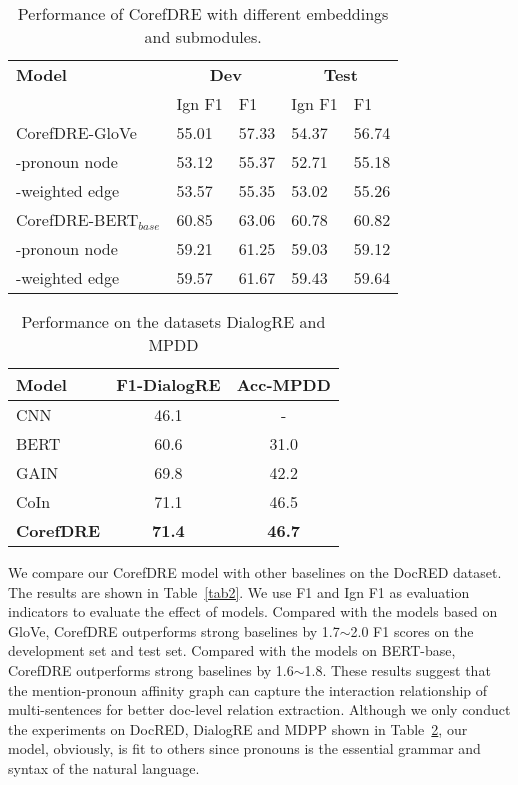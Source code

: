 \documentclass{article}
\begin{document}
\begin{table}
\centering
\setlength{\belowcaptionskip}{-0.4cm}
\begin{tabular}{lllll} \toprule
\textbf{Model} & \multicolumn{2}{c}{\textbf{Dev}}&\multicolumn{2}{c}{\textbf{Test}}   \\
\cline{2-5} &    Ign F1 & F1 & Ign F1 & F1  \\
  \midrule
  CorefDRE-GloVe &  55.01& 57.33 & 54.37 & 56.74  \\
  -pronoun node &  53.12 & 55.37 & 52.71 & 55.18   \\
  -weighted edge &  53.57 & 55.35 & 53.02 & 55.26   \\
  \midrule
  CorefDRE-BERT$_{base}$ &  60.85 & 63.06 & 60.78 & 60.82   \\
  -pronoun node &  59.21 & 61.25 & 59.03 & 59.12   \\
  -weighted edge &  59.57 & 61.67 & 59.43 & 59.64   \\
  \bottomrule
  \end{tabular}
  \caption{Performance of CorefDRE with different embeddings and submodules.}
  \label{tab3}
\end{table}

\begin{table}
\centering
\setlength{\belowcaptionskip}{-0.4cm}
\begin{tabular}{lcc}
\hline
    \textbf{Model}  & \textbf{ F1-DialogRE} & \textbf{Acc-MPDD} \\
\hline
CNN\cite{yu2020dialogue}       & 46.1  & -     \\
BERT\cite{long2021consistent}       & 60.6  & 31.0      \\
GAIN\cite{long2021consistent}     & 69.8  & 42.2   \\
CoIn\cite{long2021consistent}     & 71.1  & 46.5   \\
\hline
\textbf{CorefDRE}   & \textbf{71.4}  & \textbf{46.7}    \\
\hline
\end{tabular}
\caption{Performance on the datasets DialogRE and MPDD}
\label{tab4}
\end{table}
We compare our CorefDRE model with other baselines on the DocRED dataset. The results are shown in Table~\ref{tab2}. We use F1 and Ign F1 as evaluation indicators to evaluate the effect of models.
Compared with the models based on GloVe, CorefDRE outperforms strong baselines by 1.7$\sim$2.0 F1 scores on the development set and test set. Compared with the models on BERT-base, CorefDRE outperforms strong baselines by 1.6$\sim$1.8. These results suggest that the mention-pronoun affinity graph can capture the interaction relationship of multi-sentences for better doc-level relation extraction. Although we only conduct the experiments on DocRED, DialogRE and MDPP shown in Table~\ref{tab4}, our model, obviously, is fit to others since pronouns is the essential grammar and syntax of the natural language.
\end{document}

